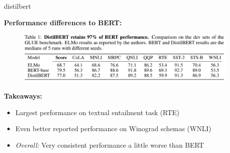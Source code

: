 
\begin{frame}{distilbert}

\vfill

	\textbf{Performance differences to BERT:}

	\begin{figure}
		\centering
		\includegraphics[width = 11cm]{figure/53-distilbert-vs-sota.png}\\ 
	\end{figure}


\textbf{Takeaways:}

\begin{itemize}
	\item Largest performance on textual entailment task (RTE)
	\item Even better reported performance on Winograd schemas (WNLI)
	\item \textit{Overall:} Very consistent performance a little worse than BERT
\end{itemize}

\vfill

\end{frame}


